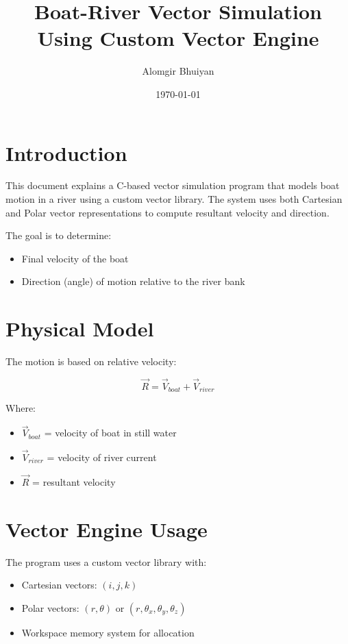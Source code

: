 \documentclass[12pt]{article}
\title{Boat-River Vector Simulation Using Custom Vector Engine}
\author{Alomgir Bhuiyan}
\date{\today}
\begin{document}
\maketitle

\section{Introduction}

This document explains a C-based vector simulation program that models boat motion in a river using a custom vector library. The system uses both Cartesian and Polar vector representations to compute resultant velocity and direction.

The goal is to determine:
\begin{itemize}
    \item Final velocity of the boat
    \item Direction (angle) of motion relative to the river bank
\end{itemize}

\section{Physical Model}

The motion is based on relative velocity:

\[
\vec{R} = \vec{V}_{boat} + \vec{V}_{river}
\]

Where:
\begin{itemize}
    \item $\vec{V}_{boat}$ = velocity of boat in still water
    \item $\vec{V}_{river}$ = velocity of river current
    \item $\vec{R}$ = resultant velocity
\end{itemize}

\section{Vector Engine Usage}

The program uses a custom vector library with:
\begin{itemize}
    \item Cartesian vectors: $(i, j, k)$
    \item Polar vectors: $(r, \theta)$ or $(r, \theta_x, \theta_y, \theta_z)$
    \item Workspace memory system for allocation
\end{itemize}
\end{document}
